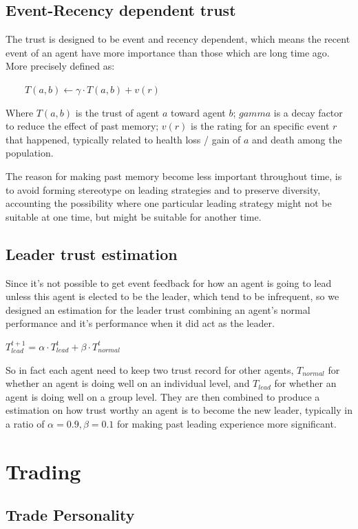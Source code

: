 \subsection{Event-Recency dependent trust}
The trust is designed to be event and recency dependent, which means the recent event of an agent have more importance than those which are long time ago. More precisely defined as:
\begin{center}
$\qquad T(a,b) \leftarrow \gamma \cdot T(a,b) + v(r)$   
\end{center}
Where $T(a,b)$ is the trust of agent $a$ toward agent $b$; $gamma$ is a decay factor to reduce the effect of past memory; $v(r)$ is the rating for an specific event $r$ that happened, typically related to health loss / gain of $a$ and death among the population.

The reason for making past memory become less important throughout time, is to avoid forming stereotype on leading strategies and to preserve diversity, accounting the possibility where one particular leading strategy might not be suitable at one time, but might be suitable for another time.

\subsection{Leader trust estimation}
Since it's not possible to get event feedback for how an agent is going to lead unless this agent is elected to be the leader, which tend to be infrequent, so we designed an estimation for the leader trust combining an agent's normal performance and it's performance when it did act as the leader.
\begin{center}
$T_{lead}^{t+1} = \alpha \cdot T_{lead}^t + \beta \cdot T_{normal}^t$    
\end{center}
So in fact each agent need to keep two trust record for other agents, $T_{normal}$ for whether an agent is doing well on an individual level, and $T_{lead}$ for whether an agent is doing well on a group level. They are then combined to produce a estimation on how trust worthy an agent is to become the new leader, typically in a ratio of $\alpha=0.9, \beta=0.1$ for making past leading experience more significant.

\section{Trading}
\subsection{Trade Personality}

